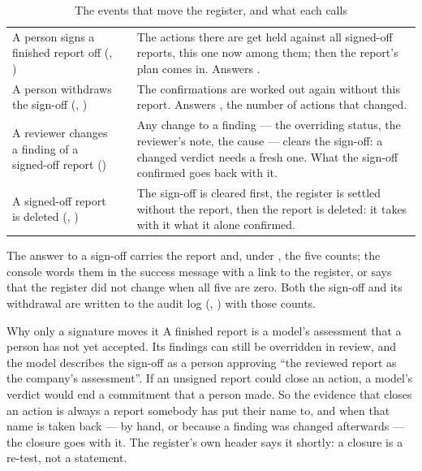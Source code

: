 \begin{table}[H]
\caption{The events that move the register, and what each calls}\label{tab:register:events}
\begin{tabularx}{\textwidth}{@{}L{48mm}L{37mm}Y@{}}
\toprule
{} &  &  \\
\midrule
A person signs a finished report off (, ) &
   &
  The actions there are get held against all signed-off reports, this one now among them;
  then the report's plan comes in. Answers . \\
A person withdraws the sign-off (, ) &
   &
  The confirmations are worked out again without this report. Answers
  , the number of actions that changed. \\
A reviewer changes a finding of a signed-off report () &
   &
  Any change to a finding --- the overriding status, the reviewer's note, the cause --- clears
  the sign-off: a changed verdict needs a fresh one. What the sign-off confirmed goes back with it. \\
A signed-off report is deleted (, ) &
   &
  The sign-off is cleared first, the register is settled without the report, then the report
  is deleted: it takes with it what it alone confirmed. \\
\bottomrule
\end{tabularx}
\end{table}

The answer to a sign-off carries the report and, under , the five counts; the
console words them in the success message with a link to the register, or says that the
register did not change when all five are zero. Both the sign-off and its withdrawal are
written to the audit log (, ) with those counts.

\begin{humanbox}{Why only a signature moves it}
A finished report is a model's assessment that a person has not yet accepted. Its findings can
still be overridden in review, and the  model describes the sign-off as a person
approving \enquote{the reviewed report as the company's assessment}. If an unsigned report
could close an action, a model's verdict would end a commitment that a person made. So the
evidence that closes an action is always a report somebody has put their name to, and when
that name is taken back --- by hand, or because a finding was changed afterwards --- the
closure goes with it. The register's own header says it shortly: a closure is a re-test, not
a statement.
\end{humanbox}

